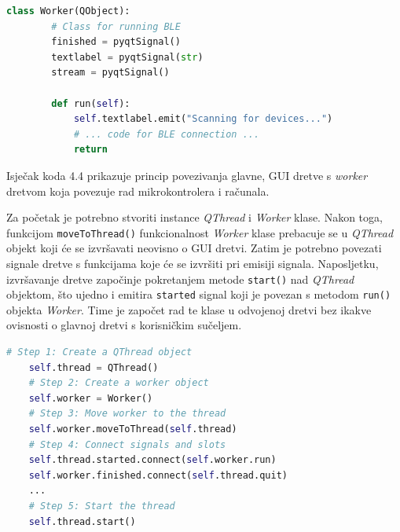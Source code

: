 \begin{lstlisting}[caption={\textit{Worker} klasa}, language=Python]
	class Worker(QObject):
		# Class for running BLE 
		finished = pyqtSignal()
		textlabel = pyqtSignal(str)
		stream = pyqtSignal()
	
		def run(self):
			self.textlabel.emit("Scanning for devices...")
			# ... code for BLE connection ... 
			return
\end{lstlisting}

Isječak koda 4.4 prikazuje princip povezivanja glavne, GUI dretve s \textit{worker} dretvom koja povezuje rad mikrokontrolera i računala.

Za početak je potrebno stvoriti instance \textit{QThread} i \textit{Worker} klase. Nakon toga, funkcijom \lstinline|moveToThread()| funkcionalnost \textit{Worker} klase prebacuje se u \textit{QThread} objekt koji će se izvršavati neovisno o GUI dretvi. Zatim je potrebno povezati signale dretve s funkcijama koje će se izvršiti pri emisiji signala. Naposljetku, izvršavanje dretve započinje pokretanjem metode \lstinline|start()| nad \textit{QThread} objektom, što ujedno i emitira \lstinline|started| signal koji je povezan s metodom \lstinline|run()| objekta \textit{Worker}. Time je započet rad te klase u odvojenoj dretvi bez ikakve ovisnosti o glavnoj dretvi s korisničkim sučeljem.

\begin{lstlisting}[caption={Povezivanje glavne dretve s \textit{worker} dretvom}, language=Python]
	# Step 1: Create a QThread object
	self.thread = QThread()
	# Step 2: Create a worker object
	self.worker = Worker()
	# Step 3: Move worker to the thread
	self.worker.moveToThread(self.thread)
	# Step 4: Connect signals and slots
	self.thread.started.connect(self.worker.run)
	self.worker.finished.connect(self.thread.quit)
	...
	# Step 5: Start the thread
	self.thread.start()
\end{lstlisting}


\eject